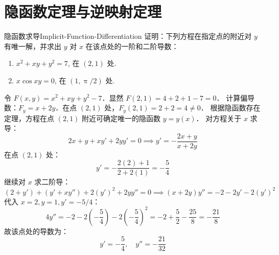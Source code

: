 \section{隐函数定理与逆映射定理}

\begin{problem}{隐函数求导}{Implicit-Function-Differentiation}
    证明：下列方程在指定点的附近对 $y$ 有唯一解，并求出 $y$ 对 $x$ 在该点处的一阶和二阶导数：
    \begin{enumerate}
        \item $x^2 + xy + y^2 = 7$, 在 $(2, 1)$ 处.
        \item $x \cos xy = 0$, 在 $(1, \uppi/2)$ 处.
    \end{enumerate}
\end{problem}

\begin{solution}
    令 $F(x, y) = x^2 + xy + y^2 - 7$．显然 $F(2, 1) = 4 + 2 + 1 - 7 = 0$．
    计算偏导数：$F_y = x + 2y$．在点 $(2, 1)$ 处，$F_y(2, 1) = 2 + 2 = 4 \neq 0$．
    根据隐函数存在定理，方程在点 $(2, 1)$ 附近可确定唯一的隐函数 $y = y(x)$．
    对方程关于 $x$ 求导：
    \begin{equation}
        2x + y + x y' + 2y y' = 0 \implies y' = -\frac{2x + y}{x + 2y}
    \end{equation}
    在点 $(2, 1)$ 处：
    \begin{equation}
        y' = -\frac{2(2) + 1}{2 + 2(1)} = -\frac{5}{4}
    \end{equation}
    继续对 $x$ 求二阶导：
    \begin{equation}
        (2 + y') + (y' + x y'') + 2(y')^2 + 2y y'' = 0 \implies (x + 2y)y'' = -2 - 2y' - 2(y')^2
    \end{equation}
    代入 $x=2, y=1, y'=-5/4$：
    \begin{equation}
        4y'' = -2 - 2\left(-\frac{5}{4}\right) - 2\left(-\frac{5}{4}\right)^2 = -2 + \frac{5}{2} - \frac{25}{8} = -\frac{21}{8}
    \end{equation}
    故该点处的导数为：
    \begin{equation}
        \boxed{y' = -\frac{5}{4}, \quad y'' = -\frac{21}{32}}
    \end{equation}


\end{solution}
